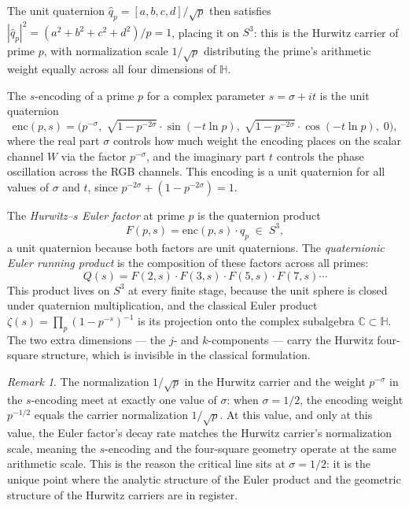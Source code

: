 \documentclass[12pt,a4paper]{article}
\theoremstyle{definition}
\theoremstyle{remark}
\newtheorem{remark}[theorem]{Remark}
\begin{document}
The unit quaternion $\hat{q}_p = [a, b, c, d] / \sqrt{p}$ then satisfies
$|\hat{q}_p|^2 = (a^2+b^2+c^2+d^2)/p = 1$, placing it on $S^3$: this is
the Hurwitz carrier of prime $p$, with normalization scale $1/\sqrt{p}$
distributing the prime's arithmetic weight equally across all four dimensions
of $\mathbb{H}$.

The $s$-encoding of a prime $p$ for a complex parameter $s = \sigma + it$ is
the unit quaternion
\[
  \mathrm{enc}(p,s) = \bigl(p^{-\sigma},\;
  \sqrt{1-p^{-2\sigma}}\cdot\sin(-t\ln p),\;
  \sqrt{1-p^{-2\sigma}}\cdot\cos(-t\ln p),\; 0\bigr),
\]
where the real part $\sigma$ controls how much weight the encoding places on
the scalar channel $W$ via the factor $p^{-\sigma}$, and the imaginary part
$t$ controls the phase oscillation across the RGB channels. This encoding is a
unit quaternion for all values of $\sigma$ and $t$, since
$p^{-2\sigma} + (1-p^{-2\sigma}) = 1$.

The \emph{Hurwitz--$s$ Euler factor} at prime $p$ is the quaternion product
\[
  F(p,s) = \mathrm{enc}(p,s) \cdot \hat{q}_p \;\in\; S^3,
\]
a unit quaternion because both factors are unit quaternions. The
\emph{quaternionic Euler running product} is the composition of these factors
across all primes:
\[
  Q(s) = F(2,s) \cdot F(3,s) \cdot F(5,s) \cdot F(7,s) \cdots
\]
This product lives on $S^3$ at every finite stage, because the unit sphere is
closed under quaternion multiplication, and the classical Euler product
$\zeta(s) = \prod_p (1-p^{-s})^{-1}$ is its projection onto the complex
subalgebra $\mathbb{C} \subset \mathbb{H}$. The two extra dimensions --- the
$j$- and $k$-components --- carry the Hurwitz four-square structure, which is
invisible in the classical formulation.

\begin{remark}
  The normalization $1/\sqrt{p}$ in the Hurwitz carrier and the weight
  $p^{-\sigma}$ in the $s$-encoding meet at exactly one value of $\sigma$:
  when $\sigma = 1/2$, the encoding weight $p^{-1/2}$ equals the carrier
  normalization $1/\sqrt{p}$. At this value, and only at this value, the
  Euler factor's decay rate matches the Hurwitz carrier's normalization scale,
  meaning the $s$-encoding and the four-square geometry operate at the same
  arithmetic scale. This is the reason the critical line sits at $\sigma = 1/2$:
  it is the unique point where the analytic structure of the Euler product
  and the geometric structure of the Hurwitz carriers are in register.
\end{remark}
\end{document}

